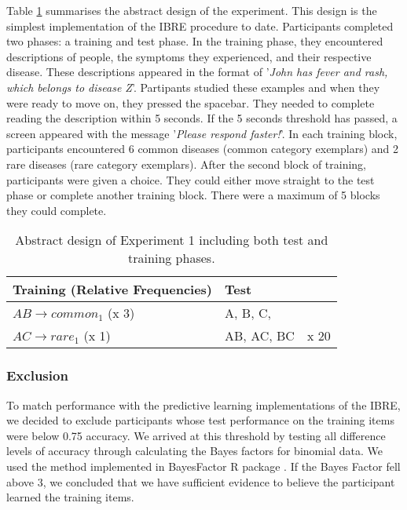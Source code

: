 \documentclass[10pt,letterpaper]{article}
\begin{document}
Table \ref{tab:abstract-exp1} summarises the abstract design of the experiment.
This design is the simplest implementation of the IBRE procedure to date.
Participants completed two phases: a training and test phase.
In the training phase, they encountered descriptions of people, the symptoms they experienced, and their respective disease.
These descriptions appeared in the format of '\textit{John has fever and rash, which belongs to disease Z}'.
Partipants studied these examples and when they were ready to move on, they pressed the spacebar.
They needed to complete reading the description within 5 seconds.
If the 5 seconds threshold has passed, a screen appeared with the message '\textit{Please respond faster!}'.
In each training block, participants encountered 6 common diseases (common category exemplars) and 2 rare diseases (rare category exemplars).
After the second block of training, participants were given a choice.
They could either move straight to the test phase or complete another training block.
There were a maximum of 5 blocks they could complete.


\begin{table}[!ht]
  \begin{center}
    \caption{Abstract design of Experiment 1 including both test and training phases. \\}
    \label{tab:abstract-exp1}
    \begin{tabular}{llr} %
      \textbf{Training (Relative Frequencies)} & \textbf{Test}& \\
      \hline
      $AB \to common_{1}$ (x 3) &  A, B, C,         &  \\
      $AC \to rare_{1}$   (x 1) &  AB, AC, BC      & x 20 \\
      \hline
    \end{tabular}
  \end{center}
\end{table}

\subsubsection*{Exclusion}

To match performance with the predictive learning implementations of the IBRE, we decided to exclude participants whose test performance on the training items were below 0.75 accuracy.
We arrived at this threshold by testing all difference levels of accuracy through calculating the Bayes factors for binomial data.
We used the method implemented in BayesFactor R package \cite{morey2022bayes}.
If the Bayes Factor fell above 3, we concluded that we have sufficient evidence to believe the participant learned the training items.
\end{document}
